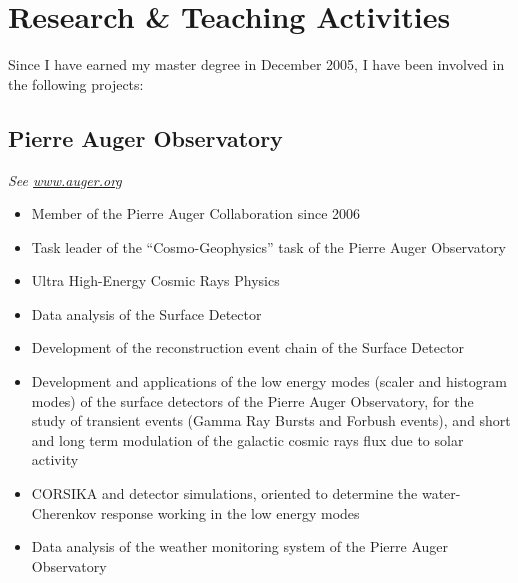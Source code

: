 \ifeng
\section*{Research \& Teaching Activities}

Since I have earned my master degree in December 2005, I have been involved in the following projects:

\subsection*{Pierre Auger Observatory}

{\small{\textit{See \href{http://www.auger.org/}{www.auger.org}}}}
\begin{itemize}
\item Member of the Pierre Auger Collaboration since 2006
\item Task leader of the ``Cosmo-Geophysics'' task of the Pierre Auger Observatory
\item Ultra High-Energy Cosmic Rays Physics 
\item Data analysis of the Surface Detector
\item Development of the reconstruction event chain of the Surface Detector
\item Development and applications of the low energy modes (scaler and histogram
modes) of the surface detectors of the Pierre Auger Observatory, for the study
of transient events (Gamma Ray Bursts and Forbush events), and short and long
term modulation of the galactic cosmic rays flux due to solar activity
\item CORSIKA and detector simulations, oriented to determine the
water-Cherenkov response working in the low energy modes
\item Data analysis of the weather monitoring system of the Pierre Auger
Observatory
\end{itemize}

